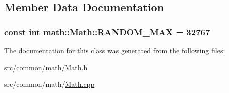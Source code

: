 \subsection{Member Data Documentation}
\hypertarget{classmath_1_1Math_a8b8007f82a1fd063ea5ce5dfacbc531e}{
\subsubsection[{RANDOM\_\-MAX}]{\setlength{\rightskip}{0pt plus 5cm}const int {\bf math::Math::RANDOM\_\-MAX} = 32767}}
\label{classmath_1_1Math_a8b8007f82a1fd063ea5ce5dfacbc531e}


The documentation for this class was generated from the following files:\begin{DoxyCompactItemize}
\item 
src/common/math/\hyperlink{Math_8h}{Math.h}\item 
src/common/math/\hyperlink{Math_8cpp}{Math.cpp}\end{DoxyCompactItemize}
